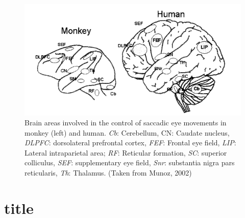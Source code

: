 \documentclass[a4paper, 11pt]{scrreprt}
\begin{document}
\begin{figure}
	\includegraphics[scale=0.5]{img/saccregions.png}
	\caption[Regions involved in saccadic eye movements]{\small{Brain areas involved in the control of saccadic eye movements in monkey (left) and human. \textit{Cb}: Cerebellum, CN: Caudate nucleus, \textit{DLPFC}: dorsolateral prefrontal cortex, \textit{FEF}: Frontal eye field, \textit{LIP}: Lateral intraparietal area; \textit{RF}: Reticular formation, \textit{SC}: superior colliculus, \textit{SEF}: supplementary eye field, \textit{Snr}: substantia nigra pars reticularis, \textit{Th}: Thalamus. (Taken from Munoz, 2002)}}
\end{figure}

\section{title}
\end{document}
